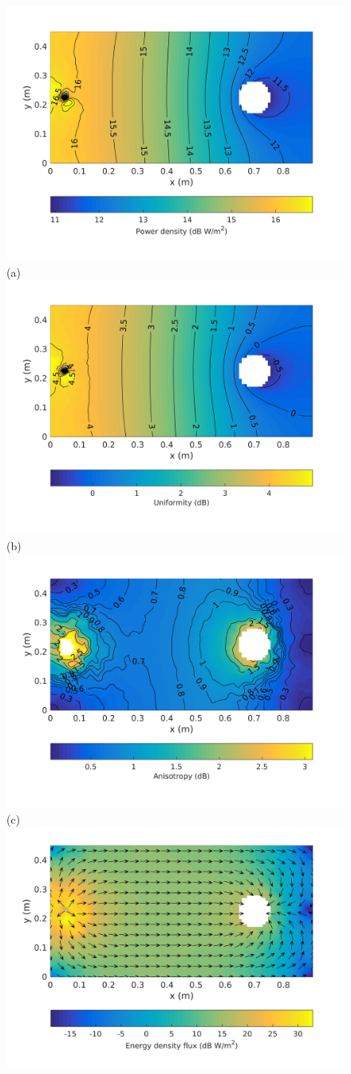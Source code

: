 \documentclass[a4paper]{article}
\numberwithin{equation}{section}
\begin{document}
\begin{figure}[ht]
\begin{center}
\includegraphics[trim={0 11mm 0 12mm},clip,width=0.55\linewidth]{figures/SDM_3D_SL_PowerDensityMap}\\
{\footnotesize (a)}\\
\vspace{2mm}
\includegraphics[trim={0 11mm 0 12mm},clip,width=0.55\linewidth]{figures/SDM_3D_SL_EnergyDensityUniformityMap}\\
{\footnotesize (b)}\\
\vspace{2mm}
\includegraphics[trim={0 11mm 0 12mm},clip,width=0.55\linewidth]{figures/SDM_3D_SL_EnergyDensityAnisotropyMap}\\
{\footnotesize (c)}\\
\vspace{2mm}
\includegraphics[trim={0 11mm 0 12mm},clip,width=0.55\linewidth]{figures/SDM_3D_SL_EnergyDensityFluxMap}\\

\end{center}
\end{figure}
\end{document}
